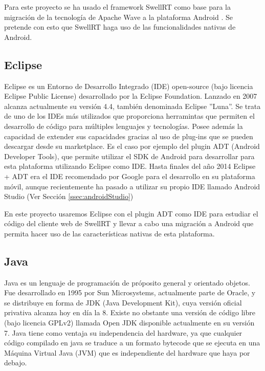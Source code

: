     Para este proyecto se ha usado el framework SwellRT como base para la migración de la tecnología de Apache Wave a la plataforma Android \cite{ref:android_platform}. Se pretende con esto que SwellRT haga uso de las funcionalidades nativas de Android.
    
    \subsection{Eclipse}\label{ssec:eclipse} 
    
	Eclipse \cite{ref:eclipse} es un Entorno de Desarrollo Integrado (IDE) open-source (bajo licencia Eclipse Public License) desarrollado por la Eclipse Foundation. Lanzado en 2007 alcanza actualmente su versión 4.4, también denominada Eclipse ''Luna''. Se trata de uno de los IDEs más utilizados que proporciona herramintas que permiten el desarrollo de código para múltiples lenguajes y tecnologías. Posee además la capacidad de extender sus capacidades gracias al uso de plug-ins que se pueden descargar desde su marketplace. Es el caso por ejemplo del plugin ADT (Android Developer Tools), que permite utilizar el SDK de Android para desarrollar para esta plataforma utilizando Eclipse como IDE. Hasta finales del año 2014 Eclipse + ADT era el IDE recomendado por Google para el desarrollo en su plataforma móvil, aunque recientemente ha pasado a utilizar su propio IDE llamado Android Studio (Ver Sección \ref{ssec:androidStudio})
	
	En este proyecto usaremos Eclipse con el plugin ADT como IDE para estudiar el código del cliente web de SwellRT y llevar a cabo una migración a Android que permita hacer uso de las características nativas de esta plataforma.
    
    \subsection{Java}\label{ssec:java}
    
	Java \cite{ref:java} es un lenguaje de programación de próposito general y orientado objetos. Fue desarrollado en 1995 por Sun Microsystems, actualmente parte de Oracle, y se distribuye en forma de JDK (Java Development Kit), cuya versión oficial privativa alcanza hoy en día la 8. Existe no obstante una versión de código libre (bajo licencia GPLv2) llamada Open JDK \cite{ref:openjdk} disponible actualmente en su versión 7. Java tiene como ventaja su independencia del hardware, ya que cualquier código compilado en java se traduce a un formato bytecode que se ejecuta en una Máquina Virtual Java (JVM) que es independiente del hardware que haya por debajo.
	
